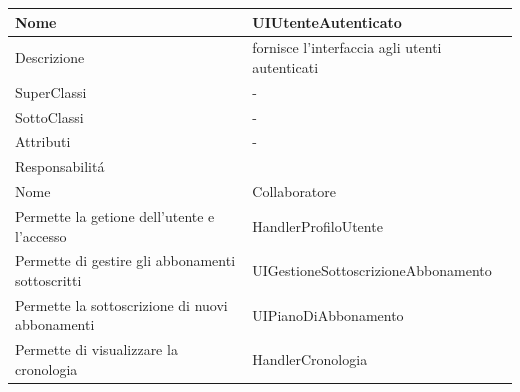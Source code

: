 \begin{center} %
    \begin{longtable}{ |p{3cm}|p{3cm}|p{3cm}|p{3cm}| }
        \hline
        Nome & \multicolumn{3}{|p{9cm}|}{UIUtenteAutenticato} \\\hline
        Descrizione & \multicolumn{3}{|p{9cm}|}{fornisce l'interfaccia agli utenti autenticati} \\\hline
        SuperClassi & \multicolumn{3}{|p{9cm}|}{-} \\\hline
        SottoClassi & \multicolumn{3}{|p{9cm}|}{-} \\\hline
        Attributi & \multicolumn{3}{|p{9cm}|}{-} \\\hline
        \multicolumn{4}{|p{12cm}|}{Responsabilit\'a} \\\hline %
        \multicolumn{2}{|p{6cm}|}{Nome} & \multicolumn{2}{|p{6cm}|}{Collaboratore} \\\hline %
        \multicolumn{2}{|p{6cm}|}{Permette la getione dell'utente e l'accesso} & \multicolumn{2}{|p{6cm}|}{HandlerProfiloUtente} \\\hline
        \multicolumn{2}{|p{6cm}|}{Permette di gestire gli abbonamenti sottoscritti} & \multicolumn{2}{|p{6cm}|}{UIGestioneSottoscrizioneAbbonamento} \\\hline
        \multicolumn{2}{|p{6cm}|}{Permette la sottoscrizione di nuovi abbonamenti} & \multicolumn{2}{|p{6cm}|}{UIPianoDiAbbonamento} \\\hline
        \multicolumn{2}{|p{6cm}|}{Permette di visualizzare la cronologia} & \multicolumn{2}{|p{6cm}|}{HandlerCronologia} \\\hline
    \end{longtable}
\end{center}


